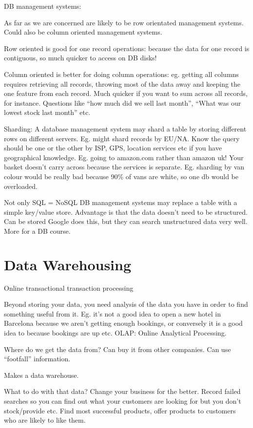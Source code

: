 \documentclass[11pt]{article}
\begin{document}
DB management systems:

As far as we are concerned are likely to be row orientated management systems. Could also be column oriented management systems.

Row oriented is good for one record operations: because the data for one record is contiguous, so much quicker to access on DB disks!

Column oriented is better for doing column operations: eg. getting all columns requires retrieving all records, throwing most of the data away and keeping the one feature from each record. Much quicker if you want to sum across all records, for instance. Questions like “how much did we sell last month”, “What was our lowest stock last month” etc.

Sharding: A database management system may shard a table by storing different rows on different servers. Eg. might shard records by EU/NA. Know the query should be one or the other by ISP, GPS, location services etc if you have geographical knowledge. Eg. going to amazon.com rather than amazon uk! Your basket doesn’t carry across because the services is separate. Eg. sharding by van colour would be really bad because 90\% of vans are white, so one db would be overloaded.

Not only SQL = NoSQL DB management systems may replace a table with a simple key/value store. Advantage is that the data doesn’t need to be structured. Can be stored Google does this, but they can search unstructured data very well. More for a DB course.

\section{Data Warehousing}

Online transactional transaction processing

Beyond storing your data, you need analysis of the data you have in order to find something useful from it. Eg. it’s not a good idea to open a new hotel in Barcelona because we aren’t getting enough bookings, or conversely it is a good idea to because bookings are up etc. OLAP: Online Analytical Processing.

Where do we get the data from? Can buy it from other companies. Can use “footfall” information.

Makes a data warehouse.

What to do with that data? Change your business for the better. Record failed searches so you can find out what your customers are looking for but you don’t stock/provide etc. Find most successful products, offer products to customers who are likely to like them.
\end{document}
